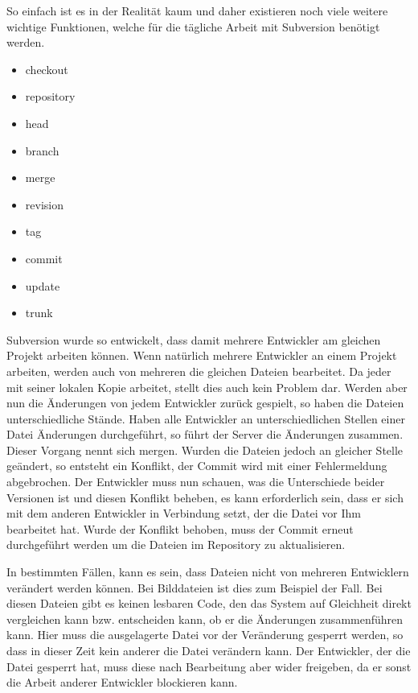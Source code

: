 So einfach ist es in der Realität kaum und daher existieren noch viele weitere wichtige Funktionen, welche für die tägliche Arbeit mit Subversion benötigt werden.

\begin{itemize}
\itemsep-8pt
\item checkout
\item repository
\item head
\item branch
\item merge
\item revision
\item tag
\item commit
\item update
\item trunk
\end{itemize}

Subversion wurde so entwickelt, dass damit mehrere Entwickler am gleichen Projekt arbeiten können. Wenn natürlich mehrere Entwickler an einem Projekt arbeiten, werden auch von mehreren die gleichen Dateien bearbeitet. Da jeder mit seiner lokalen Kopie arbeitet, stellt dies auch kein Problem dar. Werden aber nun die Änderungen von jedem Entwickler zurück gespielt, so haben die Dateien unterschiedliche Stände. Haben alle Entwickler an unterschiedlichen Stellen einer Datei Änderungen durchgeführt, so führt der Server die Änderungen zusammen. Dieser Vorgang nennt sich mergen. Wurden die Dateien jedoch an gleicher Stelle geändert, so entsteht ein Konflikt, der Commit wird mit einer Fehlermeldung abgebrochen.
Der Entwickler muss nun schauen, was die Unterschiede beider Versionen ist und diesen Konflikt beheben, es kann erforderlich sein, dass er sich mit dem anderen Entwickler in Verbindung setzt, der die Datei vor Ihm bearbeitet hat. Wurde der Konflikt behoben, muss der Commit erneut durchgeführt werden um die Dateien im Repository zu aktualisieren.

In bestimmten Fällen, kann es sein, dass Dateien nicht von mehreren Entwicklern verändert werden können. Bei Bilddateien ist dies zum Beispiel der Fall. Bei diesen Dateien gibt es keinen lesbaren Code, den das System auf Gleichheit direkt vergleichen kann bzw. entscheiden kann, ob er die Änderungen zusammenführen kann. Hier muss die ausgelagerte Datei vor der Veränderung gesperrt werden, so dass in dieser Zeit kein anderer die Datei verändern kann. Der Entwickler, der die Datei gesperrt hat, muss diese nach Bearbeitung aber wider freigeben, da er sonst die Arbeit anderer Entwickler blockieren kann.

